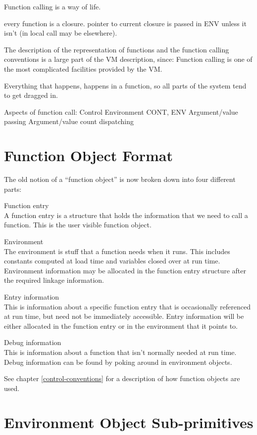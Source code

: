 {\begin{itemize, spread 0, spacing 1}
Function calling is a way of life.  

every function is a closure.  pointer to current closure is passed in ENV
unless it isn't (in local call may be elsewhere).

The description of the representation of functions and the function calling
conventions is a large part of the VM description, since:
    Function calling is one of the most complicated facilities provided by the
    VM.

    Everything that happens, happens in a function, so all parts of the system
    tend to get dragged in.


Aspects of function call:
    Control
    Environment CONT, ENV
    Argument/value passing
    Argument/value count dispatching




\section{Function Object Format}
\label{Fn-Format}

The old notion of a ``function object'' is now broken down into four different
parts:
\begin{description}
Function entry\\A function entry is a structure that holds the information
that we need to call a function.  This is the user visible function object.

Environment\\The environment is stuff that a function needs when it runs.
This includes constants computed at load time and variables closed over at run
time.  Environment information may be allocated in the function entry structure
after the required linkage information.

Entry information\\This is information about a specific function entry that is
occasionally referenced at run time, but need not be immediately accessible.
Entry information will be either allocated in the function entry
or in the environment that it points to.

Debug information\\This is information about a function that isn't normally
needed at run time.  Debug information can be found by poking around in
environment objects.
\end{description}
See chapter \ref{control-conventions} for a description of how function objects
are used.


\section{Environment Object Sub-primitives}


\end{itemize, spread 0, spacing 1}}
